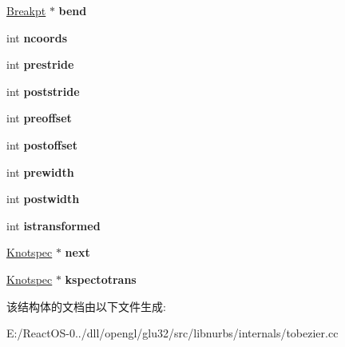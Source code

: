 \begin{DoxyCompactItemize}
\mbox{\label{struct_knotspec_a2a236e5da13e7b26f94dd9ecac9db947}} 
\hyperlink{struct_breakpt}{Breakpt} $\ast$ {\bfseries bend}
\item 
\mbox{\label{struct_knotspec_ae3dd6d2db0188d4863a92d1f1962e24e}} 
int {\bfseries ncoords}
\item 
\mbox{\label{struct_knotspec_a4c383f3c50d053c79004321b368cdbd3}} 
int {\bfseries prestride}
\item 
\mbox{\label{struct_knotspec_a7cc455f9fd0df1ecab3229b974ee52f7}} 
int {\bfseries poststride}
\item 
\mbox{\label{struct_knotspec_adcb49366d4dd0a0a18dcd8e5d79aac93}} 
int {\bfseries preoffset}
\item 
\mbox{\label{struct_knotspec_af709ef757667c784ad6524a47c193079}} 
int {\bfseries postoffset}
\item 
\mbox{\label{struct_knotspec_ae33bd9eaa9ab975239e931d764cbbeb6}} 
int {\bfseries prewidth}
\item 
\mbox{\label{struct_knotspec_a010d2a8e0f3a0c02cabd83c39d1e789d}} 
int {\bfseries postwidth}
\item 
\mbox{\label{struct_knotspec_a59d62e7ac68a030b7d2b49946d03befa}} 
int {\bfseries istransformed}
\item 
\mbox{\label{struct_knotspec_a168386f6a74d974c27d977bc5a95e82e}} 
\hyperlink{struct_knotspec}{Knotspec} $\ast$ {\bfseries next}
\item 
\mbox{\label{struct_knotspec_a6f8244e2111c869cc08ba6beb3f8a7ed}} 
\hyperlink{struct_knotspec}{Knotspec} $\ast$ {\bfseries kspectotrans}
\end{DoxyCompactItemize}


该结构体的文档由以下文件生成\+:\begin{DoxyCompactItemize}
\item 
E\+:/\+React\+O\+S-\/0../dll/opengl/glu32/src/libnurbs/internals/tobezier.\+cc\end{DoxyCompactItemize}
